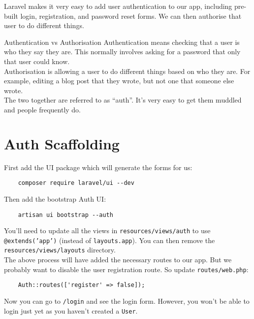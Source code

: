 Laravel makes it very easy to add user authentication to our app, including pre-built login, registration, and password reset forms. We can then authorise that user to do different things.


\begin{infobox}{Authentication vs Authorisation}
    Authentication means checking that a user is who they say they are. This normally involves asking for a password that only that user could know.
    \\

    Authorisation is allowing a user to do different things based on who they are. For example, editing a blog post that they wrote, but not one that someone else wrote.
    \\

    The two together are referred to as ``auth''. It's very easy to get them muddled and people frequently do.
\end{infobox}


\section{Auth Scaffolding}

First add the UI package which will generate the forms for us:

\begin{verbatim}
    composer require laravel/ui --dev
\end{verbatim}

Then add the bootstrap Auth UI:

\begin{verbatim}
    artisan ui bootstrap --auth
\end{verbatim}

You'll need to update all the views in \texttt{resources/views/auth} to use \texttt{@extends('app')} (instead of \texttt{layouts.app}). You can then remove the \texttt{resources/views/layouts} directory.
\\

The above process will have added the necessary routes to our app. But we probably want to disable the user registration route. So update \texttt{routes/web.php}:

\begin{verbatim}
    Auth::routes(['register' => false]);
\end{verbatim}

Now you can go to \texttt{/login} and see the login form. However, you won't be able to login just yet as you haven't created a \texttt{User}.


